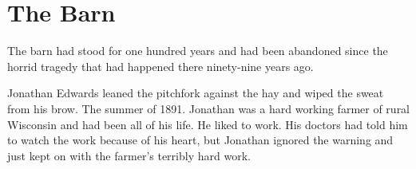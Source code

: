 \chapter{The Barn}

The barn had stood for one hundred years and had been abandoned since
the horrid tragedy that had happened there ninety-nine years ago.

Jonathan Edwards leaned the pitchfork against the hay and wiped the
sweat from his brow. The summer of 1891. Jonathan was a hard working
farmer of rural Wisconsin and had been all of his life. He liked to
work. His doctors had told him to watch the work because of his heart,
but Jonathan ignored the warning and just kept on with the farmer's
terribly hard work.

